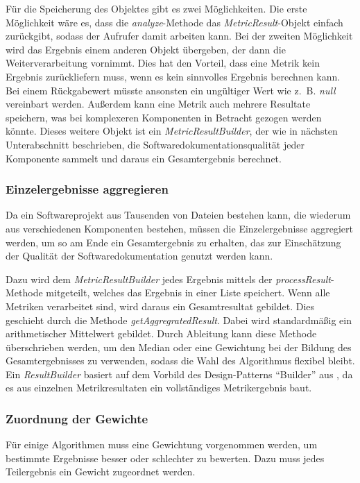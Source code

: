 Für die Speicherung des Objektes gibt es zwei Möglichkeiten. Die erste Möglichkeit wäre es, dass die \textit{analyze}-Methode das \textit{MetricResult}-Objekt einfach zurückgibt, sodass der Aufrufer damit arbeiten kann. Bei der zweiten Möglichkeit wird das Ergebnis einem anderen Objekt übergeben, der dann die Weiterverarbeitung vornimmt. Dies hat den Vorteil, dass eine Metrik kein Ergebnis zurückliefern muss, wenn es kein sinnvolles Ergebnis berechnen kann. Bei einem Rückgabewert müsste ansonsten ein ungültiger Wert wie z.~B. \textit{null} vereinbart werden. Außerdem kann eine Metrik auch mehrere Resultate speichern, was bei komplexeren Komponenten in Betracht gezogen werden könnte. Dieses weitere Objekt ist ein  \textit{MetricResultBuilder}, der wie in nächsten Unterabschnitt beschrieben, die Softwaredokumentationsqualität jeder Komponente sammelt und daraus ein Gesamtergebnis berechnet.  

\subsubsection{Einzelergebnisse aggregieren}
Da ein Softwareprojekt aus Tausenden von Dateien bestehen kann, die wiederum aus verschiedenen Komponenten bestehen, müssen die Einzelergebnisse aggregiert werden, um so am Ende ein Gesamtergebnis zu erhalten, das zur Einschätzung der Qualität der Softwaredokumentation genutzt werden kann.

Dazu wird dem \textit{MetricResultBuilder} jedes Ergebnis mittels der \textit{processResult}-Methode mitgeteilt, welches das Ergebnis in einer Liste speichert. Wenn alle Metriken verarbeitet sind, wird daraus ein Gesamtresultat gebildet. Dies geschieht durch die Methode \textit{getAggregratedResult}. Dabei wird standardmäßig ein arithmetischer Mittelwert gebildet. Durch Ableitung kann diese Methode überschrieben werden, um den Median oder eine Gewichtung bei der Bildung des Gesamtergebnisses zu verwenden, sodass die Wahl des Algorithmus flexibel bleibt. Ein \textit{ResultBuilder} basiert auf dem Vorbild des Design-Patterns \enquote{Builder} aus \cite[S.139-149]{gamma2015design}, da es aus einzelnen Metrikresultaten ein vollständiges Metrikergebnis baut.


 
\subsubsection{Zuordnung der Gewichte}\label{chapter_weights_assign}
Für einige Algorithmen muss eine Gewichtung vorgenommen werden, um bestimmte Ergebnisse besser oder schlechter zu bewerten. Dazu muss jedes Teilergebnis ein Gewicht zugeordnet werden. 

